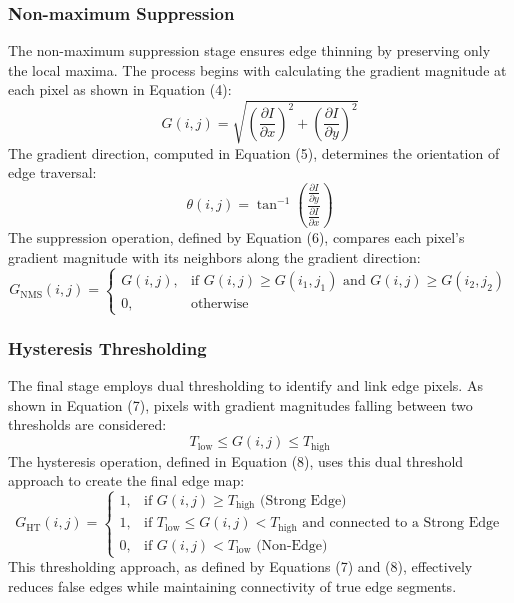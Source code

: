 \documentclass[12pt]{article}
\begin{document}
\subsubsection{Non-maximum Suppression}
The non-maximum suppression stage ensures edge thinning by preserving only the local maxima. The process begins with calculating the gradient magnitude at each pixel as shown in Equation (4):
\begin{equation}
G(i, j) = \sqrt{\left( \frac{\partial I}{\partial x} \right)^2 + \left( \frac{\partial I}{\partial y} \right)^2}
\end{equation}
The gradient direction, computed in Equation (5), determines the orientation of edge traversal:
\begin{equation}
\theta(i, j) = \tan^{-1} \left( \frac{\frac{\partial I}{\partial y}}{\frac{\partial I}{\partial x}} \right)
\end{equation}
The suppression operation, defined by Equation (6), compares each pixel's gradient magnitude with its neighbors along the gradient direction:
\begin{equation}
    G_{\text{NMS}}(i, j) =
    \begin{cases}
    G(i, j), & \text{if } G(i, j) \geq G(i_1, j_1) \text{ and } G(i, j) \geq G(i_2, j_2) \\
    0, & \text{otherwise}
    \end{cases}
    \end{equation}
\subsubsection{Hysteresis Thresholding}
The final stage employs dual thresholding to identify and link edge pixels. As shown in Equation (7), pixels with gradient magnitudes falling between two thresholds are considered:
\begin{equation}
T_{\text{low}} \leq G(i, j) \leq T_{\text{high}}
\end{equation}
The hysteresis operation, defined in Equation (8), uses this dual threshold approach to create the final edge map:
\begin{equation}
    G_{\text{HT}}(i, j) =
    \begin{cases}
    1, & \text{if } G(i, j) \geq T_{\text{high}} \text{ (Strong Edge)} \\
    1, & \text{if } T_{\text{low}} \leq G(i, j) < T_{\text{high}} \text{ and connected to a Strong Edge} \\
    0, & \text{if } G(i, j) < T_{\text{low}} \text{ (Non-Edge)}
    \end{cases}
    \end{equation}
This thresholding approach, as defined by Equations (7) and (8), effectively reduces false edges while maintaining connectivity of true edge segments.
\end{document}
